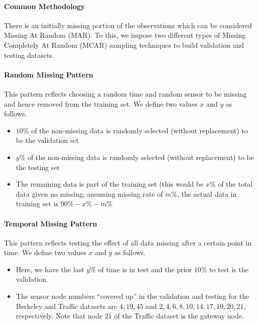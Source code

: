 \paragraph*{Common Methodology}

There is an initially missing portion of the observations which can be considered Missing At Random (MAR).
To this, we impose two different types of Missing Completely At Random (MCAR) sampling techniques to build validation and testing datasets.

\paragraph*{Random Missing Pattern}

This pattern reflects choosing a random time and random sensor to be missing and hence removed from the training set.
We define two values $x$ and $y$ as follows.

\begin{itemize}
\item $10\%$ of the non-missing data is randomly selected (without replacement) to be the validation set
\item $y\%$ of the non-missing data is randomly selected (without replacement) to be the testing set
\item The remaining data is part of the training set (this would be $x\%$ of the total data given no missing; assuming missing rate of $m\%$, the actual data in training set is $90\%-x\%-m\%$
\end{itemize}

\paragraph*{Temporal Missing Pattern}

This pattern reflects testing the effect of all data missing after a certain point in time.
We define two values $x$ and $y$ as follows.

\begin{itemize}
\item Here, we have the last $y\%$ of time is in test and the prior $10\%$ to test is the validation.
\item The sensor node numbers ``covered up'' in the validation and testing for the Berkeley and Traffic datasets are ${4,19,45}$ and ${2,4,6,8,10,14,17,19,20,21}$, respectively.
Note that node $21$ of the Traffic dataset is the gateway node.
\end{itemize}

